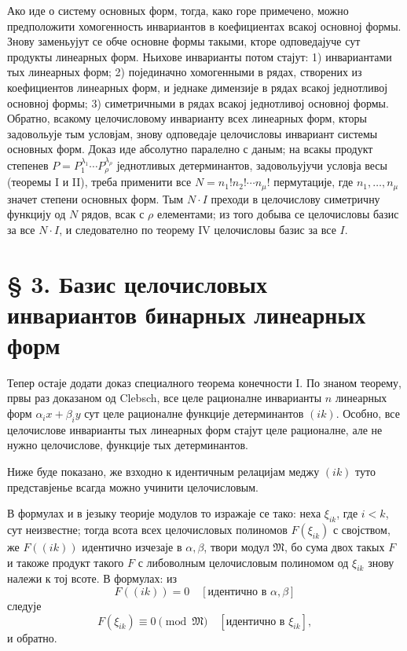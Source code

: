 ﻿\documentclass[11pt]{article}
\providecommand{\frM}{\mathfrak M}
\begin{document}
Ако иде о систему основных форм, тогда, како горе примечено, можно предположити хомогенность инвариантов в коефициентах всакој основној формы. Знову заменьујут се обче основне формы такыми, кторе одповедајуче сут продукты линеарных форм. Ньихове инварианты потом стајут: 1) инвариантами тых линеарных форм; 2) појединачно хомогенными в рядах, створених из коефициентов линеарных форм, и једнаке димензије в рядах всакој једнотливој основној формы; 3) симетричными в рядах всакој једнотливој основној формы. Обратно, всакому целочисловому инварианту всех линеарных форм, кторы задовольује тым условјам, знову одповедаје целочисловы инвариант системы основных форм. Доказ иде абсолутно паралелно с даным; на всакы продукт степенев \(P=P_1^{\lambda_1}\cdots P_\rho^{\lambda_\rho}\) једнотливых детерминантов, задовольујучи условја весы (теоремы I и II), треба применити все \(N=n_1!n_2!\cdots n_\mu!\) пермутације, где \(n_1,\ldots,n_\mu\) значет степени основных форм. Тым \(N\cdot I\) преходи в целочислову симетричну функцију од \(N\) рядов, всак с \(\rho\) елементами; из того добыва се целочисловы базис за все \(N\cdot I\), и следователно по теорему IV целочисловы базис за все \(I\).

\setcounter{equation}{0}
\section*{§ 3. Базис целочисловых инвариантов бинарных линеарных форм}

Тепер остаје додати доказ специалного теорема конечности I. По знаном теорему, првы раз доказаном од Clebsch, все целе рационалне инварианты \(n\) линеарных форм \(\alpha_i x+\beta_i y\) сут целе рационалне функције детерминантов \((ik)\). Особно, все целочислове инварианты тых линеарных форм стајут целе рационалне, але не нужно целочислове, функције тых детерминантов.

Ниже буде показано, же взходно к идентичным релацијам меджу \((ik)\) туто представјенье всагда можно учинити целочисловым.

В формулах и в језыку теорије модулов то изражаје се тако: неха \(\xi_{ik}\), где \(i<k\), сут неизвестне; тогда всота всех целочисловых полиномов \(F(\xi_{ik})\) с својством, же \(F((ik))\) идентично изчезаје в \(\alpha,\beta\), твори модул \(\frM\), бо сума двох такых \(F\) и такоже продукт такого \(F\) с либоволным целочисловым полиномом од \(\xi_{ik}\) знову належи к тој всоте. В формулах: из
\[
        F((ik))=0\quad [\text{идентично в \(\alpha,\beta\)}]
\]
следује
\[
        F(\xi_{ik})\equiv0\pmod{\frM}\quad [\text{идентично в \(\xi_{ik}\)}],
\]
и обратно.
\end{document}
